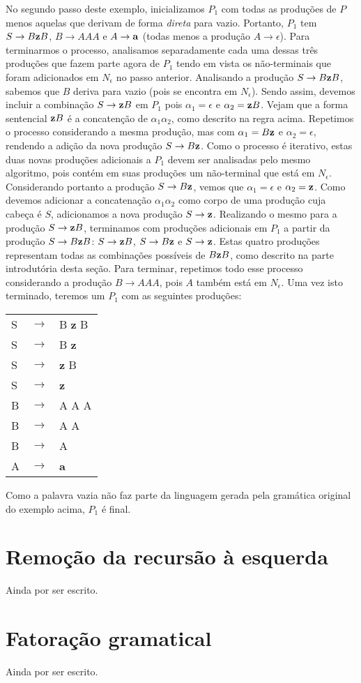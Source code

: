 \documentclass{compiladores}
\renewcommand{\flecha}{\rightarrow}
\newcommand{\flech}{$\rightarrow$}
\begin{document}
No segundo passo deste exemplo, inicializamos $P_1$ com todas as
produções de $P$ menos aquelas que derivam de forma \emph{direta} para
vazio. Portanto, $P_1$ tem $S \flecha B {\bf z} B$, $B \flecha AAA$ e
$A \flecha {\bf a}$ (todas menos a produção $A \flecha
\epsilon$). Para terminarmos o processo, analisamos separadamente cada
uma dessas três produções que fazem parte agora de $P_1$ tendo em
vista os não-terminais que foram adicionados em $N_\epsilon$ no passo
anterior. Analisando a produção $S \flecha B {\bf z} B$, sabemos que
$B$ deriva para vazio (pois se encontra em $N_\epsilon$). Sendo assim,
devemos incluir a combinação $S \flecha {\bf z} B$ em $P_1$ pois
$\alpha_1 = \epsilon$ e $\alpha_2 = {\bf z} B$. Vejam que a forma
sentencial ${\bf z}B$ é a concatenção de $\alpha_1 \alpha_2$, como
descrito na regra acima. Repetimos o processo considerando a mesma
produção, mas com $\alpha_1 = B {\bf z}$ e $\alpha_2 = \epsilon$,
rendendo a adição da nova produção $S \flecha B {\bf z}$. Como o
processo é iterativo, estas duas novas produções adicionais a $P_1$
devem ser analisadas pelo mesmo algoritmo, pois contém em suas
produções um não-terminal que está em $N_\epsilon$. Considerando
portanto a produção $S \flecha B {\bf z}$, vemos que $\alpha_1 =
\epsilon$ e $\alpha_2 = {\bf z}$. Como devemos adicionar a
concatenação $\alpha_1 \alpha_2$ como corpo de uma produção cuja
cabeça é $S$, adicionamos a nova produção $S \flecha {\bf
  z}$. Realizando o mesmo para a produção $S \flecha {\bf z} B$,
terminamos com produções adicionais em $P_1$ a partir da produção $S
\flecha B {\bf z} B$: $S \flecha {\bf z} B$, $S \flecha B {\bf z}$ e
$S \flecha {\bf z}$. Estas quatro produções representam todas as
combinações possíveis de $B{\bf z}B$, como descrito na parte
introdutória desta seção. Para terminar, repetimos todo esse processo
considerando a produção $B \flecha AAA$, pois $A$ também está em
$N_\epsilon$. Uma vez isto terminado, teremos um $P_1$ com as
seguintes produções:

\begin{center}
\begin{tabular}{lll}
S & \flech & B {\bf z} B \\
S & \flech & B {\bf z} \\
S & \flech & {\bf z} B \\
S & \flech & {\bf z} \\
B & \flech & A A A \\
B & \flech & A A \\
B & \flech & A  \\
A & \flech & {\bf a} \\
\end{tabular}
\end{center}

Como a palavra vazia não faz parte da linguagem gerada pela gramática
original do exemplo acima, $P_1$ é final.

\section{Remoção da recursão à esquerda}

Ainda por ser escrito.

\section{Fatoração gramatical}

Ainda por ser escrito.
\end{document}
